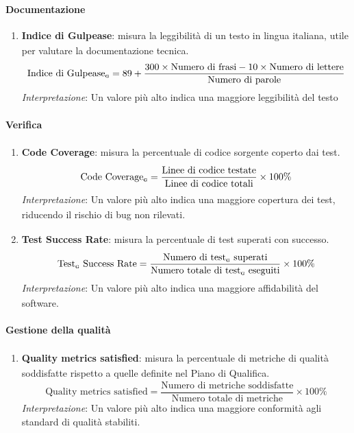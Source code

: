 \documentclass[a4paper,11pt]{article}
\newcommand{\G}{\textsubscript{\scalebox{0.6}{\textbf{G}}}}
\begin{document}
\paragraph{Documentazione}
{
    \begin{enumerate}[label=\textbf{MPC\arabic*}, leftmargin=4.5em, resume=metriche_processo]
        \item \textbf{Indice di Gulpease\G{}}: misura la leggibilità di un testo in lingua italiana, utile per valutare la documentazione tecnica.
            \[ \text{Indice di Gulpease\G{}} = 89 + \frac{300 \times \text{Numero di frasi} - 10 \times \text{Numero di lettere}}{\text{Numero di parole}} \]
            \textit{Interpretazione}: Un valore più alto indica una maggiore leggibilità del testo

    \end{enumerate}
}
\paragraph{Verifica\G{}}{
    \begin{enumerate}[label=\textbf{MPC\arabic*}, leftmargin=4.5em, resume=metriche_processo] 

        \item \textbf{Code Coverage\G{}}: misura la percentuale di codice sorgente coperto dai test\G{}.
        \[ \text{Code Coverage\G{}} = \frac{\text{Linee di codice testate}}{\text{Linee di codice totali}} \times 100\% \]
        \textit{Interpretazione}: Un valore più alto indica una maggiore copertura dei test\G{}, riducendo il rischio\G{} di bug non rilevati.

        \item \textbf{Test\G{} Success Rate}: misura la percentuale di test\G{} superati con successo.
        \[ \text{Test\G{} Success Rate} = \frac{\text{Numero di test\G{} superati}}{\text{Numero totale di test\G{} eseguiti}} \times 100\% \]
        \textit{Interpretazione}: Un valore più alto indica una maggiore affidabilità\G{} del software.
    \end{enumerate}
}
\paragraph{Gestione della qualità\G{}}{
    \begin{enumerate}[label=\textbf{MPC\arabic*}, leftmargin=4.5em, resume=metriche_processo]
        \item \textbf{Quality metrics satisfied}: misura la percentuale di metriche di qualità\G{} soddisfatte rispetto a quelle definite nel Piano di Qualifica\G{}.
        \[ \text{Quality metrics satisfied} = \frac{\text{Numero di metriche soddisfatte}}{\text{Numero totale di metriche}} \times 100\% \]
        \textit{Interpretazione}: Un valore più alto indica una maggiore conformità agli standard di qualità\G{} stabiliti.

    \end{enumerate}
}
\end{document}
